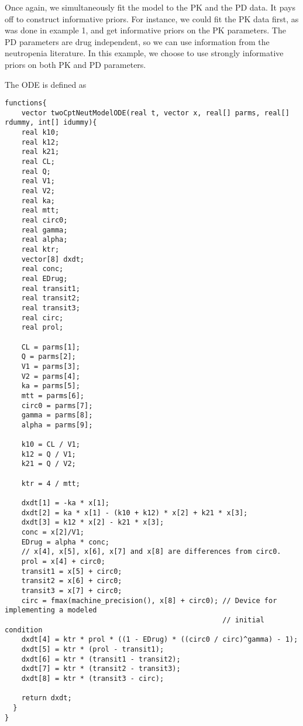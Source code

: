 \documentclass[12pt, reqno, oneside]{amsbook}
\numberwithin{equation}{chapter}
\numberwithin{figure}{chapter}
\numberwithin{table}{chapter}
\theoremstyle{remark}
\begin{document}
Once again, we simultaneously fit the model to the PK and the PD
data. It pays off to construct informative priors. For instance, we could
fit the PK data first, as was done in  example 1, and get informative
priors on the PK parameters. The PD parameters are drug independent,
so we can use information from the neutropenia literature. In this
example, we choose to use strongly informative priors on both PK and PD
parameters.

The ODE is defined as
\begin{verbatim}
functions{
    vector twoCptNeutModelODE(real t, vector x, real[] parms, real[] rdummy, int[] idummy){
    real k10;
    real k12;
    real k21;
    real CL;
    real Q;
    real V1;
    real V2;
    real ka;
    real mtt;
    real circ0;
    real gamma;
    real alpha;
    real ktr;
    vector[8] dxdt;
    real conc;
    real EDrug;
    real transit1;
    real transit2;
    real transit3;
    real circ;
    real prol;

    CL = parms[1];
    Q = parms[2];
    V1 = parms[3];
    V2 = parms[4];
    ka = parms[5];
    mtt = parms[6];
    circ0 = parms[7];
    gamma = parms[8];
    alpha = parms[9];

    k10 = CL / V1;
    k12 = Q / V1;
    k21 = Q / V2;

    ktr = 4 / mtt;

    dxdt[1] = -ka * x[1];
    dxdt[2] = ka * x[1] - (k10 + k12) * x[2] + k21 * x[3];
    dxdt[3] = k12 * x[2] - k21 * x[3];
    conc = x[2]/V1;
    EDrug = alpha * conc;
    // x[4], x[5], x[6], x[7] and x[8] are differences from circ0.
    prol = x[4] + circ0;
    transit1 = x[5] + circ0;
    transit2 = x[6] + circ0;
    transit3 = x[7] + circ0;
    circ = fmax(machine_precision(), x[8] + circ0); // Device for implementing a modeled
                                                    // initial condition
    dxdt[4] = ktr * prol * ((1 - EDrug) * ((circ0 / circ)^gamma) - 1);
    dxdt[5] = ktr * (prol - transit1);
    dxdt[6] = ktr * (transit1 - transit2);
    dxdt[7] = ktr * (transit2 - transit3);
    dxdt[8] = ktr * (transit3 - circ);

    return dxdt;
  }
}
\end{verbatim}
\end{document}
